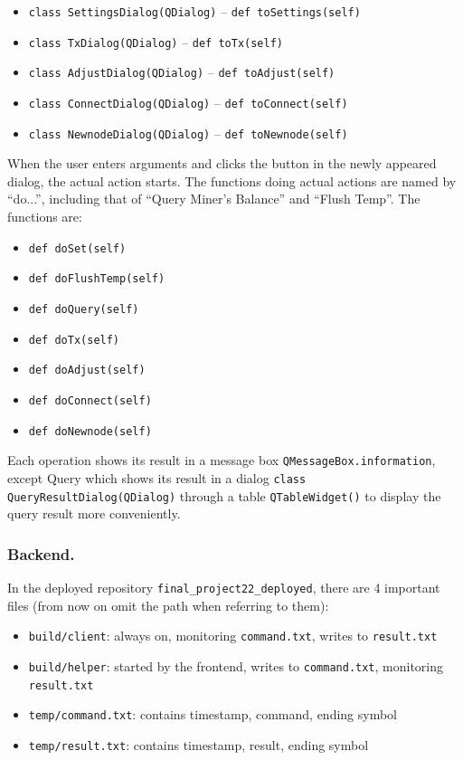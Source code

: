 \documentclass[12pt]{article}
\begin{document}
\begin{itemize}
    \item \texttt{class SettingsDialog(QDialog)} \quad -- \quad \texttt{def toSettings(self)}
    \item \texttt{class TxDialog(QDialog)} \quad -- \quad \texttt{def toTx(self)}
    \item \texttt{class AdjustDialog(QDialog)} \quad -- \quad \texttt{def toAdjust(self)}
    \item \texttt{class ConnectDialog(QDialog)} \quad -- \quad \texttt{def toConnect(self)}
    \item \texttt{class NewnodeDialog(QDialog)} \quad -- \quad \texttt{def toNewnode(self)}
\end{itemize}

When the user enters arguments and clicks the button in the newly appeared dialog, the actual action starts. The functions doing actual actions are named by ``do...'', including that of ``Query Miner's Balance'' and ``Flush Temp''. The functions are:

\begin{itemize}
    \item \texttt{def doSet(self)}
    \item \texttt{def doFlushTemp(self)}
    \item \texttt{def doQuery(self)}
    \item \texttt{def doTx(self)}
    \item \texttt{def doAdjust(self)}
    \item \texttt{def doConnect(self)}
    \item \texttt{def doNewnode(self)}
\end{itemize}

Each operation shows its result in a message box \texttt{QMessageBox.information}, except Query which shows its result in a dialog \texttt{class QueryResultDialog(QDialog)} through a table \texttt{QTableWidget()} to display the query result more conveniently.

\subsubsection*{Backend.}

In the deployed repository \texttt{final\_project22\_deployed}, there are 4 important files (from now on omit the path when referring to them):

\begin{itemize}
    \item \texttt{build/client}: always on, monitoring \texttt{command.txt}, writes to \texttt{result.txt}
    \item \texttt{build/helper}: started by the frontend, writes to \texttt{command.txt}, monitoring \texttt{result.txt}
    \item \texttt{temp/command.txt}: contains timestamp, command, ending symbol
    \item \texttt{temp/result.txt}: contains timestamp, result, ending symbol
\end{itemize}
\end{document}
